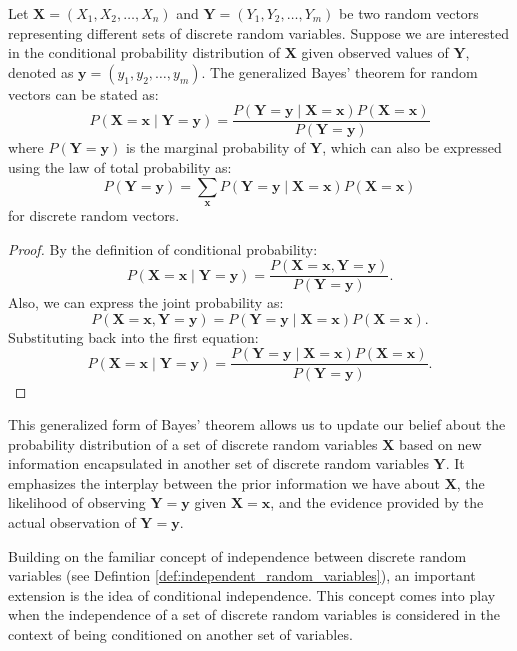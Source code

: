 \begin{theorem}
Let \( \mathbf{X} = (X_1, X_2, \ldots, X_n) \) and \( \mathbf{Y} = (Y_1, Y_2, \ldots, Y_m) \) be two random vectors representing different sets of discrete random variables. Suppose we are interested in the conditional probability distribution of \( \mathbf{X} \) given observed values of \( \mathbf{Y} \), denoted as \( \mathbf{y} = (y_1, y_2, \ldots, y_m) \). The generalized Bayes' theorem for random vectors can be stated as:
\[
P(\mathbf{X} = \mathbf{x} \mid \mathbf{Y} = \mathbf{y}) = \frac{P(\mathbf{Y} = \mathbf{y} \mid \mathbf{X} = \mathbf{x}) P(\mathbf{X} = \mathbf{x})}{P(\mathbf{Y} = \mathbf{y})}
\]
where \( P(\mathbf{Y} = \mathbf{y}) \) is the marginal probability of \( \mathbf{Y} \), which can also be expressed using the law of total probability as:
\[
P(\mathbf{Y} = \mathbf{y}) = \sum_{\mathbf{x}} P(\mathbf{Y} = \mathbf{y} \mid \mathbf{X} = \mathbf{x}) P(\mathbf{X} = \mathbf{x})
\]
for discrete random vectors.
\end{theorem}
\begin{proof}
By the definition of conditional probability:
\[
P(\mathbf{X} = \mathbf{x} \mid \mathbf{Y} = \mathbf{y}) = \frac{P(\mathbf{X} = \mathbf{x}, \mathbf{Y} = \mathbf{y})}{P(\mathbf{Y} = \mathbf{y})}.
\]
Also, we can express the joint probability as:
\[
P(\mathbf{X} = \mathbf{x}, \mathbf{Y} = \mathbf{y}) = P(\mathbf{Y} = \mathbf{y} \mid \mathbf{X} = \mathbf{x}) P(\mathbf{X} = \mathbf{x}).
\]
Substituting back into the first equation:
\[
P(\mathbf{X} = \mathbf{x} \mid \mathbf{Y} = \mathbf{y}) = \frac{P(\mathbf{Y} = \mathbf{y} \mid \mathbf{X} = \mathbf{x}) P(\mathbf{X} = \mathbf{x})}{P(\mathbf{Y} = \mathbf{y})}.
\]
\end{proof}

This generalized form of Bayes' theorem allows us to update our belief about the probability distribution of a set of discrete random variables \( \mathbf{X} \) based on new information encapsulated in another set of discrete random variables \( \mathbf{Y} \). It emphasizes the interplay between the prior information we have about \( \mathbf{X} \), the likelihood of observing \( \mathbf{Y} = \mathbf{y} \) given \( \mathbf{X} = \mathbf{x} \), and the evidence provided by the actual observation of \( \mathbf{Y} = \mathbf{y} \).

Building on the familiar concept of independence between discrete random variables (see Defintion \ref{def:independent_random_variables}), an important extension is the idea of conditional independence. This concept comes into play when the independence of a set of discrete random variables is considered in the context of being conditioned on another set of variables.

